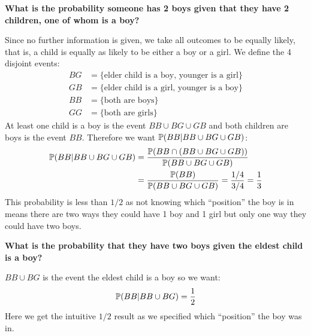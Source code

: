 \documentclass[../main.tex]{subfiles}
\begin{document}
\begin{example}
  \textbf{What is the probability someone has 2 boys given that they have 2 children, one of whom is a boy?}\par
  Since no further information is given, we take all outcomes to be equally likely, that is, a child is equally as likely to be either a boy or a girl.
  We define the 4 disjoint events:
  \begin{align*}
    BG &= \{\text{elder child is a boy, younger is a girl}\} \\
    GB &= \{\text{elder child is a girl, younger is a boy}\} \\
    BB &= \{\text{both are boys}\} \\
    GG &= \{\text{both are girls}\}
  \end{align*}
  At least one child is a boy is the event $BB \cup BG \cup GB$ and both children are boys is the event $BB$.
  Therefore we want $\P(BB \vert BB \cup BG \cup GB)$:
  \begin{align*}
    \P(BB \vert BB \cup BG \cup GB) &= \frac{\P(BB \cap (BB \cup BG \cup GB))}{\P(BB \cup BG \cup GB)} \\
                                    &= \frac{\P(BB)}{\P(BB \cup BG \cup GB)} = \frac{1/4}{3/4} = \frac{1}{3}
  \end{align*}
  This probability is less than $1/2$ as not knowing which ``position'' the boy is in means there are two ways they could have 1 boy and 1 girl but only one way they could have two boys.

  \textbf{What is the probability that they have two boys given the eldest child is a boy?}\par
  $BB \cup BG$ is the event the eldest child is a boy so we want:
  \[
    \P(BB \vert BB \cup BG) = \frac{1}{2}
  \]
  Here we get the intuitive $1/2$ result as we specified which ``position'' the boy was in.


\end{example}
\end{document}
